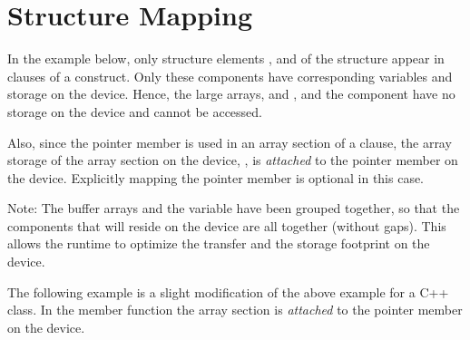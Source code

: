 \pagebreak
\section{Structure Mapping}
\label{sec:structure_mapping}



In the example below, only structure elements ,  and  
of the  structure appear in  clauses of a  construct.
Only these components have corresponding variables and storage on the device.  
Hence, the large arrays,  and , and the  component have no storage 
on the device and cannot be accessed.  

Also, since the pointer member  is used in an array section of a 
 clause, the array storage of the array section on the device, 
, is \emph{attached} to the pointer member  on the device.
Explicitly mapping the pointer member  is optional in this case.

Note: The buffer arrays and the  variable have been grouped together, so that
the components that will reside on the device are all together (without gaps).
This allows the runtime to optimize the transfer and the storage footprint on the device.



The following example is a slight modification of the above example for 
a C++ class.  In the member function  
the array section  is \emph{attached} to the pointer member 
on the device.
 


